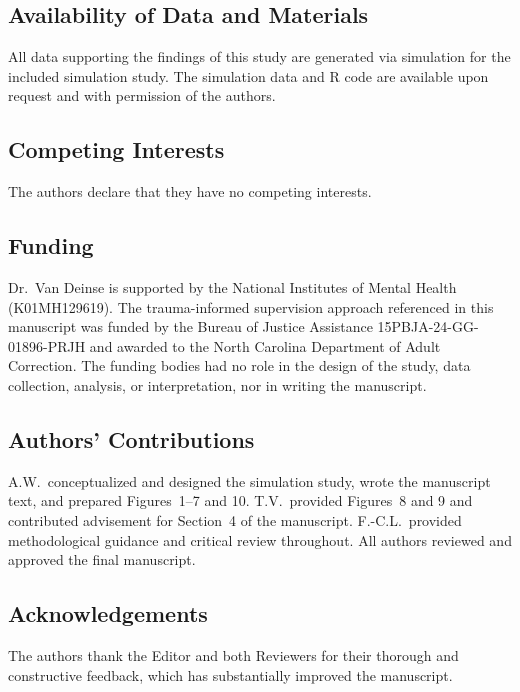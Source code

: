 \documentclass{article}[11pt]
\begin{document}
\subsection*{Availability of Data and Materials}
All data supporting the findings of this study are generated via simulation for the included simulation study. The simulation data and R code are available upon request and with permission of the authors.

\subsection*{Competing Interests}
The authors declare that they have no competing interests.

\subsection*{Funding}
Dr.\ Van Deinse is supported by the National Institutes of Mental Health (K01MH129619). The trauma-informed supervision approach referenced in this manuscript was funded by the Bureau of Justice Assistance 15PBJA-24-GG-01896-PRJH and awarded to the North Carolina Department of Adult Correction. The funding bodies had no role in the design of the study, data collection, analysis, or interpretation, nor in writing the manuscript.

\subsection*{Authors' Contributions}
A.W.\ conceptualized and designed the simulation study, wrote the manuscript text, and prepared Figures~1--7 and 10. T.V.\ provided Figures~8 and 9 and contributed advisement for Section~4 of the manuscript. F.-C.L.\ provided methodological guidance and critical review throughout. All authors reviewed and approved the final manuscript.

\subsection*{Acknowledgements}
The authors thank the Editor and both Reviewers for their thorough and constructive feedback, which has substantially improved the manuscript.



\end{document}
